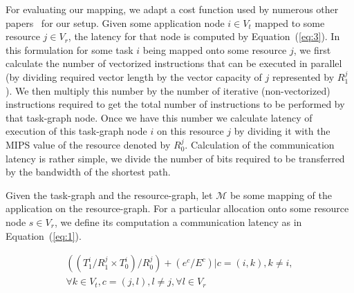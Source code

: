 \documentclass[10pt, conference, compsocconf]{IEEEtran}
\begin{document}
For evaluating our mapping, we adapt a cost function used by numerous
other papers~\cite{ssan05,ajai04,dajw12} for our setup.  Given some
application node $i \in V_t$ mapped to some resource $j \in V_r$, the
latency for that node is computed by Equation~(\ref{eq:3}). In this
formulation for some task $i$ being mapped onto some resource $j$, we
first calculate the number of vectorized instructions that can be
executed in parallel (by dividing required vector length by the vector
capacity of $j$ represented by $R^j_1$). We then multiply this number by
the number of iterative (non-vectorized) instructions required to get
the total number of instructions to be performed by that task-graph
node. Once we have this number we calculate latency of execution of this
task-graph node $i$ on this resource $j$ by dividing it with the MIPS
value of the resource denoted by $R^j_0$. Calculation of the
communication latency is rather simple, we divide the number of bits
required to be transferred by the bandwidth of the shortest path.

Given the task-graph and the resource-graph, let $\mathcal{M}$ be some
mapping of the application on the resource-graph. For a particular
allocation onto some resource node $s \in V_r$, we define its
computation a communication latency as in Equation~(\ref{eq:1}).

\begin{equation}
  \label{eq:3}
  \begin{array}{c}
    ((T^i_1/R^j_1\times T^i_0)/R^j_0)
    + (e^c/E^c) | c = (i,k), k \neq i, \\ \forall k \in V_t, c = (j,l), l
    \neq
    j, \forall l \in V_r 
  \end{array}
\end{equation}
\end{document}
